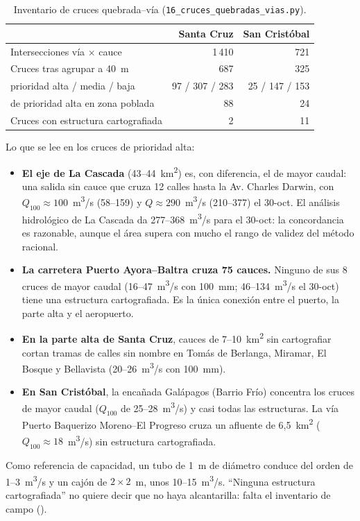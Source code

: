 \documentclass{sosg-informe}
\newcommand{\kmc}{km\textsuperscript{2}}
\newcommand{\mcs}{m\textsuperscript{3}/s}
\begin{document}
\begin{table}[ht]
  \centering\small
  \caption{Inventario de cruces quebrada--vía (\texttt{16\_cruces\_quebradas\_vias.py}).}
  \label{tab:cruces}
  \begin{tabular}{lrr}
    \toprule
    & Santa Cruz & San Cristóbal \\
    \midrule
    Intersecciones vía $\times$ cauce & 1\,410 & 721 \\
    Cruces tras agrupar a 40~m & 687 & 325 \\
    \quad prioridad alta / media / baja & 97 / 307 / 283 & 25 / 147 / 153 \\
    \quad de prioridad alta en zona poblada & 88 & 24 \\
    Cruces con estructura cartografiada & 2 & 11 \\
    \bottomrule
  \end{tabular}
\end{table}

Lo que se lee en los cruces de prioridad alta:
\begin{itemize}
  \item \textbf{El eje de La Cascada} (43--44~\kmc) es, con diferencia, el de mayor caudal: una salida sin cauce que cruza 12 calles hasta la Av. Charles Darwin, con $Q_{100} \approx 100$~\mcs{} (58--159) y $Q \approx 290$~\mcs{} (210--377) el 30-oct. El análisis hidrológico de La Cascada da 277--368~\mcs{} para el 30-oct: la concordancia es razonable, aunque el área supera con mucho el rango de validez del método racional.
  \item \textbf{La carretera Puerto Ayora--Baltra cruza 75 cauces.} Ninguno de sus 8 cruces de mayor caudal (16--47~\mcs{} con 100~mm; 46--134~\mcs{} el 30-oct) tiene una estructura cartografiada. Es la única conexión entre el puerto, la parte alta y el aeropuerto.
  \item \textbf{En la parte alta de Santa Cruz}, cauces de 7--10~\kmc{} sin cartografiar cortan tramas de calles sin nombre en Tomás de Berlanga, Miramar, El Bosque y Bellavista (20--26~\mcs{} con 100~mm).
  \item \textbf{En San Cristóbal}, la encañada Galápagos (Barrio Frío) concentra los cruces de mayor caudal ($Q_{100}$ de 25--28~\mcs) y casi todas las estructuras. La vía Puerto Baquerizo Moreno--El Progreso cruza un afluente de 6,5~\kmc{} ($Q_{100} \approx 18$~\mcs) sin estructura cartografiada.
\end{itemize}
Como referencia de capacidad, un tubo de 1~m de diámetro conduce del orden de 1--3~\mcs{} y un cajón de $2 \times 2$~m, unos 10--15~\mcs. \enquote{Ninguna estructura cartografiada} no quiere decir que no haya alcantarilla: falta el inventario de campo ().
\end{document}

